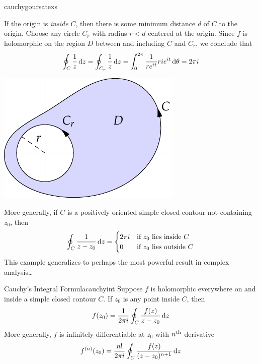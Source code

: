 \begin{examples}{}{cauchygoursatexs}
\begin{enumerate}
\begin{itemize}
	  	\begin{minipage}[t]{0.6\linewidth}\vspace{0pt}
	    	\item If the origin is \emph{inside}  $C$, then there is some minimum distance $d$ of $C$ to the origin. Choose any circle $C_r$ with radius $r<d$ centered at the origin. Since $f$ is holomorphic on the region $D$ between and including $C$ and $C_r$, we conclude that
				\[
					\oint_C\frac 1z\,{\mathrm{d} z}=\oint_{C_r}\frac 1z\,{\mathrm{d} z} =\int_0^{2\pi}\frac 1{re^{it}}ri e^{it}\,{\mathrm{d}\theta}=2\pi i
				\]
	  	\end{minipage}
	  	\hfill
	  	\begin{minipage}[t]{0.39\linewidth}\vspace{0pt}
	  		\flushright\includegraphics[scale=0.95]{cauchygoursat}
	  	\end{minipage}
  	\end{itemize}

  	More generally, if $C$ is a positively-oriented simple closed contour not containing $z_0$, then
  	\[
  		\oint_C\frac 1{z-z_0}\,{\mathrm{d} z}=
  		\begin{cases}
  			2\pi i&\text{if $z_0$ lies inside $C$}\\
  			0&\text{if $z_0$ lies outside $C$}
  		\end{cases}
  	\]
  	This example generalizes to perhaps the most powerful result in complex analysis\ldots
	\end{enumerate}
\end{examples}


\goodbreak



\begin{thm}{Cauchy's Integral Formula}{cauchyint}
	Suppose $f$ is holomorphic everywhere on and inside a simple closed contour $C$. If $z_0$ is any point inside $C$, then
	\[
		f(z_0)=\frac 1{2\pi i}\oint_C\frac{f(z)}{z-z_0}\,{\mathrm{d} z}
	\]
	More generally, $f$ is infinitely differentiable at $z_0$ with $n\textsuperscript{th}$ derivative
	\[
		f^{(n)}(z_0)=\frac{n!}{2\pi i}\oint_C\frac{f(z)}{(z-z_0)^{n+1}}\,{\mathrm{d} z}
	\]
\end{thm}

